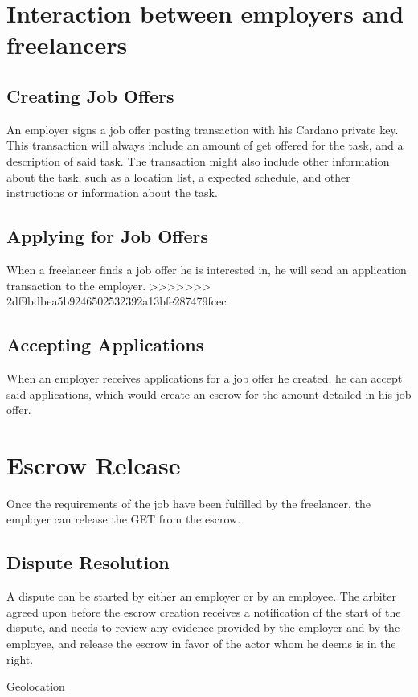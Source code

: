 \documentclass{article}
\begin{document}
\section{Interaction between employers and freelancers}

\subsection{Creating Job Offers}
An employer signs a job offer posting transaction with his Cardano private key. This transaction will always include an amount of get offered for the task, and a description of said task. The transaction might also include other information about the task, such as a location list, a expected schedule, and other instructions or information about the task.

\subsection{Applying for Job Offers}
When a freelancer finds a job offer he is interested in, he will send an application transaction to the employer.
>>>>>>> 2df9bdbea5b9246502532392a13bfe287479fcec

\subsection{Accepting Applications}
When an employer receives applications for a job offer he created, he can accept said applications, which would create an escrow for the amount detailed in his job offer.

\section{Escrow Release}
Once the requirements of the job have been fulfilled by the freelancer, the employer can release the GET from the escrow.

\subsection{Dispute Resolution}
A dispute can be started by either an employer or by an employee. The arbiter agreed upon before the escrow creation receives a notification of the start of the dispute, and needs to review any evidence provided by the employer and by the employee, and release the escrow in favor of the actor whom he deems is in the right.

Geolocation
\end{document}
